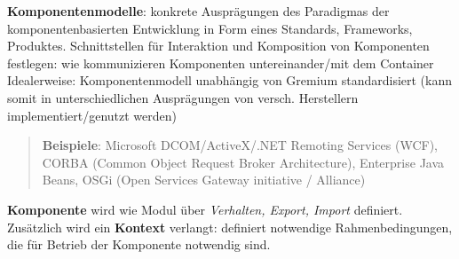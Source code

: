 \documentclass[a4paper]{article}
\begin{document}
	\newpage
	\noindent
	\textbf{Komponentenmodelle}: konkrete Ausprägungen des Paradigmas der komponentenbasierten Entwicklung in Form eines Standards, Frameworks, Produktes. Schnittstellen für Interaktion und Komposition von Komponenten festlegen: wie kommunizieren Komponenten untereinander/mit dem Container Idealerweise: Komponentenmodell unabhängig von Gremium standardisiert (kann somit in unterschiedlichen Ausprägungen von versch. Herstellern implementiert/genutzt werden)
	\begin{quote}
			\textbf{Beispiele}: Microsoft DCOM/ActiveX/.NET Remoting Services (WCF), CORBA (Common Object Request Broker Architecture), Enterprise Java Beans, OSGi (Open Services Gateway initiative / Alliance)
	\end{quote}
	\textbf{Komponente} wird wie Modul über \textit{Verhalten, Export, Import} definiert. \\
	Zusätzlich wird ein \textbf{Kontext} verlangt: definiert notwendige Rahmenbedingungen, die für Betrieb der Komponente notwendig sind.
	
\end{document}
